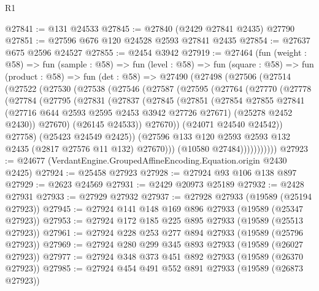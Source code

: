 \begin{lexlean}{R1}
\begin{coremodule}
@27841 := @131 @24533
@27845 := @27840 (@2429 @27841 @2435) @27790
@27851 := @27596 @676 @120 @24528 @2593 @27841 @2435
@27854 := @27637 @675 @2596 @24527
@27855 := @2454 @3942
@27919 := @27464
    (fun (weight : @58) =>
    fun (sample : @58) =>
    fun (level : @58) =>
    fun (square : @58) =>
    fun (product : @58) =>
    fun (det : @58) =>
    @27490
      (@27498
        (@27506
          (@27514
            (@27522
              (@27530
                (@27538
                  (@27546
                    (@27587
                      (@27595
                        (@27764
                          (@27770
                            (@27778
                              (@27784
                                (@27795
                                  (@27831
                                    (@27837
                                      (@27845
                                        (@27851
                                          (@27854
                                            @27855
                                            @27841
                                            (@27716 @644 @2593 @2595 @2453 @3942 @27726 @27671)
                                            (@25278 @2452 @2430))
                                          @27670)
                                        (@26145 @24533))
                                      @27670))
                                  (@24071 @24540 @24542))
                                @27758)
                              (@25423 @24549 @2425))
                            (@27596
                              @133
                              @120
                              @2593
                              @2593
                              @132
                              @2435
                              (@2817 @27576 @11 @132)
                              @27670)))
                        (@10580 @27484)))))))))))
@27923 := @24677 (VerdantEngine.GroupedAffineEncoding.Equation.origin @2430 @2425)
@27924 := @25458 @27923
@27928 := @27924 @93 @106 @138 @897
@27929 := @2623 @24569
@27931 := @2429 @20973 @25189
@27932 := @2428 @27931
@27933 := @27929 @27932
@27937 := @27928 @27933 (@19589 (@25194 @27923))
@27945 := @27924 @141 @148 @169 @896 @27933 (@19589 (@25347 @27923))
@27953 := @27924 @172 @185 @225 @895 @27933 (@19589 (@25513 @27923))
@27961 := @27924 @228 @253 @277 @894 @27933 (@19589 (@25796 @27923))
@27969 := @27924 @280 @299 @345 @893 @27933 (@19589 (@26027 @27923))
@27977 := @27924 @348 @373 @451 @892 @27933 (@19589 (@26370 @27923))
@27985 := @27924 @454 @491 @552 @891 @27933 (@19589 (@26873 @27923))

\end{coremodule}
\end{lexlean}
